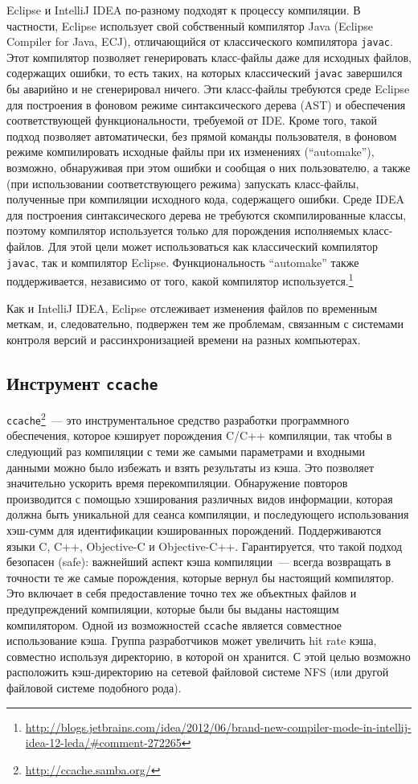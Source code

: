 Eclipse и IntelliJ IDEA по-разному подходят к процессу компиляции. В частности, Eclipse использует свой собственный компилятор Java (Eclipse Compiler for Java, ECJ), отличающийся от классического компилятора \texttt{javac}. Этот компилятор позволяет генерировать класс-файлы даже для исходных файлов, содержащих ошибки, то есть таких, на которых классический \texttt{javac} завершился бы аварийно и не сгенерировал ничего. Эти класс-файлы требуются среде Eclipse для построения в фоновом режиме синтаксического дерева (AST) и обеспечения соответствующей функциональности, требуемой от IDE. Кроме того, такой подход позволяет автоматически, без прямой команды пользователя, в фоновом режиме компилировать исходные файлы при их изменениях (``automake''), возможно, обнаруживая при этом ошибки и сообщая о них пользователю, а также (при использовании соответствующего режима) запускать класс-файлы, полученные при компиляции исходного кода, содержащего ошибки.
Среде IDEA для построения синтаксического дерева не требуются скомпилированные классы, поэтому компилятор используется только для порождения исполняемых класс-файлов. Для этой цели может использоваться как классический компилятор \texttt{javac}, так и компилятор Eclipse. Функциональность ``automake'' также поддерживается, независимо от того, какой компилятор используется.\footnote{\url{http://blogs.jetbrains.com/idea/2012/06/brand-new-compiler-mode-in-intellij-idea-12-leda/\#comment-272265}}

Как и IntelliJ IDEA, Eclipse отслеживает изменения файлов по временным меткам, и, следовательно, подвержен тем же проблемам, связанным с системами контроля версий и рассинхронизацией времени на разных компьютерах.

\subsection{Инструмент \texttt{ccache}}
\texttt{ccache}\footnote{\url{http://ccache.samba.org/}}~--- это инструментальное средство разработки программного обеспечения, которое кэширует порождения C/C++ компиляции, так чтобы в следующий раз компиляции с теми же самыми параметрами и входными данными можно было избежать и взять результаты из кэша. Это позволяет значительно ускорить время перекомпиляции. Обнаружение повторов производится с помощью хэширования различных видов информации, которая должна быть уникальной для сеанса компиляции, и последующего использования хэш-сумм для идентификации кэшированных порождений. Поддерживаются языки C, C++, Objective-C и Objective-C++. Гарантируется, что такой подход безопасен (safe): важнейший аспект кэша компиляции~--- всегда возвращать в точности те же самые порождения, которые вернул бы настоящий компилятор. Это включает в себя предоставление точно тех же объектных файлов и предупреждений компиляции, которые были бы выданы настоящим компилятором.
Одной из возможностей \texttt{ccache} является совместное использование кэша. Группа разработчиков может увеличить hit rate кэша, совместно используя директорию, в которой он хранится. С этой целью возможно расположить кэш-директорию на сетевой файловой системе NFS (или другой файловой системе подобного рода).

